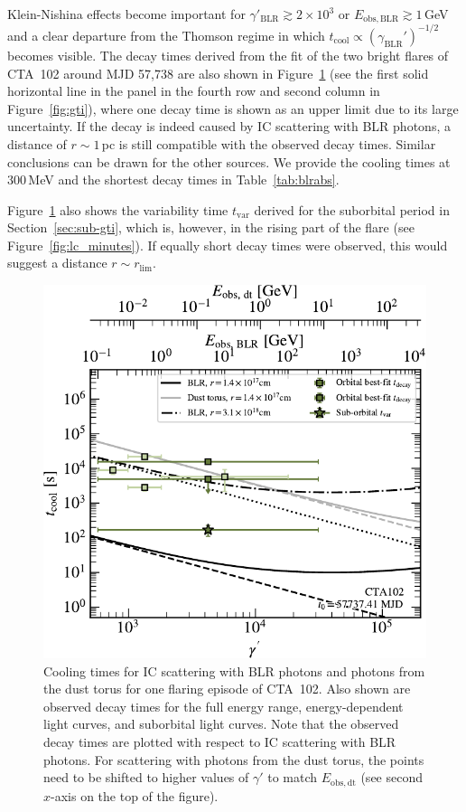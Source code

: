 \documentclass[twocolumn]{aastex62}
\begin{document}
Klein-Nishina effects become important for $\gamma'_\mathrm{BLR} \gtrsim 2\times10^3$ or $E_\mathrm{obs,BLR}\gtrsim1\,$GeV and a clear departure from the Thomson regime in which 
$t_\mathrm{cool}\propto(\gamma_\mathrm{BLR}')^{-1/2}$
becomes visible.
The decay times derived from the fit of the two bright flares of CTA~102 around MJD 57,738 are also shown in Figure~\ref{fig:tcool}
(see the first solid horizontal line in the panel in the fourth row and second column in Figure~\ref{fig:gti}), where one decay time is shown as an upper limit due to its large uncertainty. 
If the decay is indeed caused by IC scattering with BLR photons, a distance of $r\sim1\,$pc is still compatible with the observed decay times. 
Similar conclusions can be drawn for the other sources. 
We provide the cooling times at 300\,MeV and the shortest decay times in Table~\ref{tab:blrabs}.

Figure~\ref{fig:tcool} also shows the variability time $t_\mathrm{var}$ derived for the suborbital period in Section~\ref{sec:sub-gti}, which is, however, in the rising part of the flare (see Figure~\ref{fig:lc_minutes}). If equally short decay times were observed, this would suggest a distance $r \sim r_\mathrm{lim}$. 

\begin{figure}
    \centering
    \includegraphics[width = .9\linewidth]{tcool_CTA102_t001_LogParabola_ring.pdf}
    \caption{Cooling times for IC scattering with BLR photons and photons from the dust torus for one flaring episode of CTA~102. Also shown are observed decay times for the full energy range, energy-dependent light curves, and suborbital light curves.
    Note that the observed decay times are plotted with respect to IC scattering with BLR photons. For scattering with photons from the dust torus, the points need to be shifted to higher values of $\gamma'$ to match $E_\mathrm{obs,dt}$ (see second $x$-axis on the top of the figure).}
    \label{fig:tcool}
\end{figure}
\end{document}
